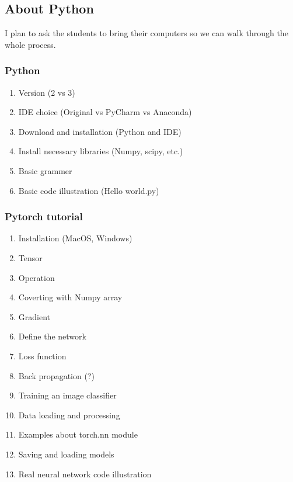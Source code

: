 \subsection{About Python}
I plan to ask the students to bring their computers so we can walk through the whole process.

\subsubsection{Python}
\begin{enumerate}
\item Version (2 vs 3)
\item IDE choice (Original vs PyCharm vs Anaconda)
\item Download and installation (Python and IDE)
\item Install necessary libraries (Numpy, scipy, etc.)
\item Basic grammer 
\item Basic code illustration (Hello world.py)
\end{enumerate}

\subsubsection{Pytorch tutorial}
\begin{enumerate}
\item Installation (MacOS, Windows)
\item Tensor 
\item Operation 
\item Coverting with Numpy array
\item Gradient
\item Define the network
\item Loss function
\item Back propagation (?)
\item Training an image classifier
\item Data loading and processing 
\item Examples about torch.nn module
\item Saving and loading models
\item Real neural network code illustration
\end{enumerate}

